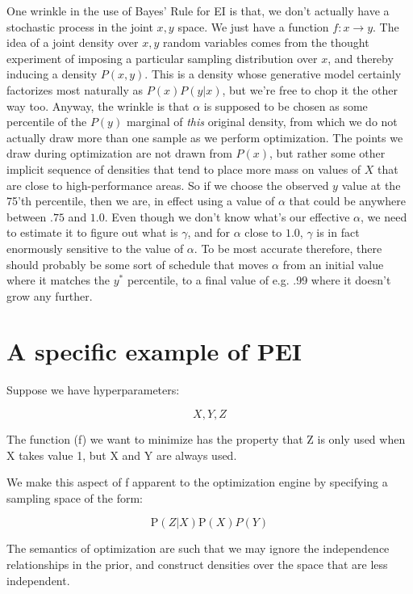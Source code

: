\documentclass{article}
\begin{document}
One wrinkle in the use of Bayes' Rule for EI is that, we don't actually have a stochastic process in the joint $x, y$ space.
We just have a function $f:x \rightarrow y$.
The idea of a joint density over $x, y$ random variables comes from the thought experiment of imposing a particular sampling distribution over $x$,
and thereby inducing a density $P(x, y)$. 
This is a density whose generative model certainly factorizes most naturally as $P(x)P(y|x)$, but we're free to chop it the other way too.
Anyway, the wrinkle is that $\alpha$ is supposed to be chosen as some percentile of the $P(y)$ marginal of {\em this} original density, from which
we do not actually draw more than one sample as we perform optimization.
The points we draw during optimization are not drawn from $P(x)$, but rather some other implicit sequence of densities that tend
to place more mass on values of $X$ that are close to high-performance areas.
So if we choose the observed $y$ value at the 75'th percentile, then we are, in effect using a value of $\alpha$ that could be anywhere between $.75$ and $1.0$.
Even though we don't know what's our effective $\alpha$, we need to estimate it to figure out what is $\gamma$, and for $\alpha$ close to $1.0$, $\gamma$ is 
in fact enormously sensitive to the value of $\alpha$.
To be most accurate therefore, there should probably be some sort of schedule that moves $\alpha$ from an initial value where it matches the $y^*$ percentile,
to a final value of e.g. .99 where it doesn't grow any further.



\section{A specific example of PEI}

Suppose we have hyperparameters:

\begin{equation}
    X, Y, Z
\end{equation}

The function (f) we want to minimize has the property that Z is only used when
X takes value 1, but X and Y are always used.

We make this aspect of f apparent to the optimization engine by specifying a
sampling space of the form:

\begin{equation}
    \mathrm{P}(Z | X) \mathrm{P}(X) P(Y)
\end{equation}

The semantics of optimization are such that we may ignore the independence
relationships in the prior, and construct densities over the space that are
less independent.
\end{document}
